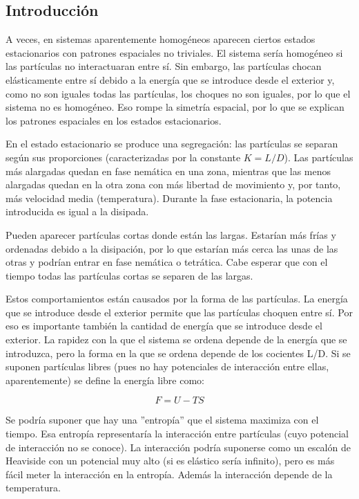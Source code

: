 \documentclass[twoside]{article}
\begin{document}
\begin{multicols}{2} %

\section*{Introducci\'on}

A veces, en sistemas aparentemente homog\'eneos aparecen ciertos estados estacionarios con patrones espaciales no triviales. El sistema ser\'ia homog\'eneo si las part\'iculas no interactuaran entre s\'i. Sin embargo, las part\'iculas chocan el\'asticamente entre s\'i debido a la energ\'ia que se introduce desde el exterior y, como no son iguales todas las part\'iculas, los choques no son iguales, por lo que el sistema no es homog\'eneo. Eso rompe la simetr\'ia espacial, por lo que se explican los patrones espaciales en los estados estacionarios.

En el estado estacionario se produce una segregaci\'on: las part\'iculas se separan seg\'un sus proporciones (caracterizadas por la constante $K=L/D$). Las part\'iculas m\'as alargadas quedan en fase nem\'atica en una zona, mientras que las menos alargadas quedan en la otra zona con m\'as libertad de movimiento y, por tanto, m\'as velocidad media (temperatura). Durante la fase estacionaria, la potencia introducida es igual a la disipada.

Pueden aparecer part\'iculas cortas donde est\'an las largas. Estar\'ian m\'as fr\'ias y ordenadas debido a la disipaci\'on, por lo que estar\'ian m\'as cerca las unas de las otras y podr\'ian entrar en fase nem\'atica o tetr\'atica. Cabe esperar que con el tiempo todas las part\'iculas cortas se separen de las largas.

Estos comportamientos est\'an causados por la forma de las part\'iculas. La energ\'ia que se introduce desde el exterior permite que las part\'iculas choquen entre s\'i. Por eso es importante tambi\'en la cantidad de energ\'ia que se introduce desde el exterior. La rapidez con la que el sistema se ordena depende de la energ\'ia que se introduzca, pero la forma en la que se ordena depende de los cocientes L/D. Si se suponen part\'iculas libres (pues no hay potenciales de interacci\'on entre ellas, aparentemente) se  define la energ\'ia libre como:

\begin{equation}
F = U - TS
\end{equation}

Se podr\'ia suponer que hay una ''entrop\'ia'' que el sistema maximiza con el tiempo. Esa entrop\'ia representar\'ia la interacci\'on entre part\'iculas (cuyo potencial de interacci\'on no se conoce). La interacci\'on podr\'ia suponerse como un escal\'on de Heaviside con un potencial muy alto (si es el\'astico ser\'ia infinito), pero es m\'as f\'acil meter la interacci\'on en la entrop\'ia. Adem\'as la interacci\'on depende de la temperatura.


\end{multicols}
\end{document}
